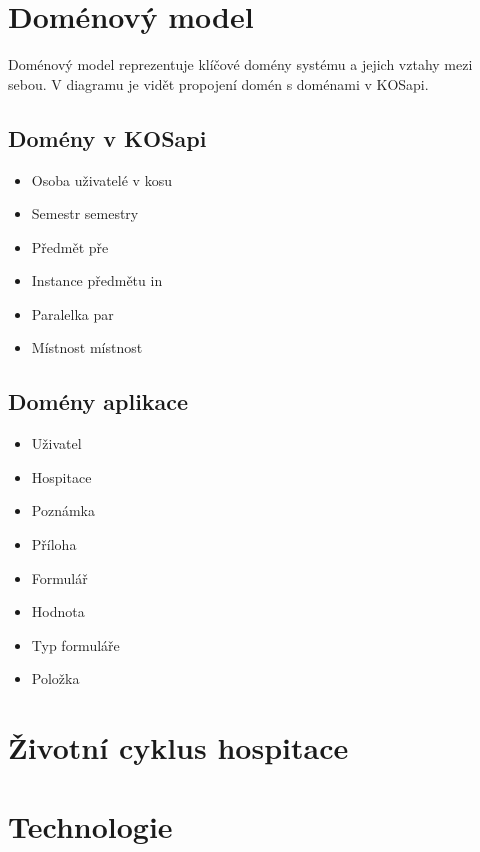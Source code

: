 \section{Doménový model}
Doménový model reprezentuje klíčové domény systému a jejich vztahy mezi sebou. V diagramu je vidět propojení domén s doménami v KOSapi.
\subsection{Domény v KOSapi}
\begin{itemize}
\item Osoba uživatelé v kosu
\item Semestr semestry 
\item Předmět pře
\item Instance předmětu in
\item Paralelka par
\item Místnost místnost
\end{itemize}

\subsection{Domény aplikace}
\begin{itemize}
\item Uživatel
\item Hospitace
\item Poznámka
\item Příloha
\item Formulář
\item Hodnota
\item Typ formuláře
\item Položka
\end{itemize}

\section{Životní cyklus hospitace}

\section{Technologie}



